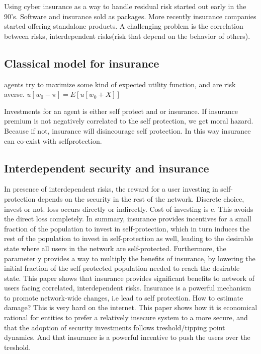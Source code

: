 Using cyber insurance as a way to handle residual risk started out early in the 90's. 
Software and insurance sold as packages. 
 More recently insurance companies started offering standalone products.
  A challenging problem is the correlation between risks, interdependent risks(risk that depend on the behavior of others).

\subsection{Classical model for insurance}
agents try to maximize some kind of expected utility function, and are risk averse.
$u[w_{0}-\pi]=E[u[w_{0}+X]]$

Investments for an agent is either self protect and or insurance.
If insurance premium is not negatively correlated to the self protection, we get moral hazard. Because if not, insurance will disincourage self protection.
In this way insurance can co-exist with selfprotection.
\subsection{Interdependent security and insurance}
In presence of interdependent risks, the reward for a user investing in self-protection depends on the security in the rest of the network.
Discrete choice, invest or not. loss occurs directly or indirectly. Cost of investing is c. This avoids the direct loss completely. 
In summary, insurance provides incentives for a
small fraction of the population to invest in self-protection, which in turn induces the rest
of the population to invest in self-protection as well, leading to the desirable state where
all users in the network are self-protected. Furthermore, the parameter y provides a way
to multiply the beneﬁts of insurance, by lowering the initial fraction of the self-protected
population needed to reach the desirable state.
This paper shows that insurance provides significant benefits to network of users facing correlated, 
interdependent risks. Insurance is a powerful mechanism to promote network-wide changes, i.e lead to self protection.
How to estimate damage? This is very hard on the internet. 
This paper shows how it is economical rational for entities to prefer a relatively 
insecure system to a more secure, and that the adoption of security investments follows treshold/tipping point dynamics. 
And that insurance is a powerful incentive to push the users over the treshold.

